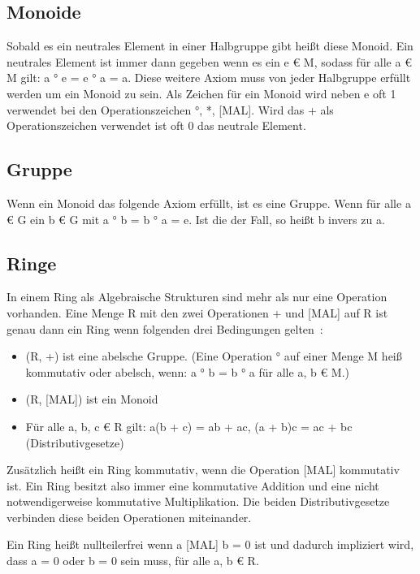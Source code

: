 		\subsection{Monoide}
			Sobald es ein neutrales Element in einer Halbgruppe gibt heißt diese Monoid. Ein neutrales Element ist immer dann gegeben wenn es ein e € M, sodass für alle a € M gilt: a ° e = e ° a = a. Diese weitere Axiom muss von jeder Halbgruppe erfüllt werden um ein Monoid zu sein. Als Zeichen für ein Monoid wird neben e oft 1 verwendet bei den Operationszeichen °, *, [MAL]. Wird das + als Operationszeichen verwendet ist oft 0 das neutrale Element.~\cite[S.~46]{Erste:Hilfe:in:Linearer:Algebra}
		
		\subsection{Gruppe}
			Wenn ein Monoid das folgende Axiom erfüllt, ist es eine Gruppe. Wenn für alle a € G ein b € G mit a ° b = b ° a = e. Ist die der Fall, so heißt b invers zu a.~\cite[S.~48]{Erste:Hilfe:in:Linearer:Algebra}
		
		\subsection{Ringe}
			In einem Ring als Algebraische Strukturen sind mehr als nur eine Operation vorhanden. Eine Menge R mit den zwei Operationen + und [MAL] auf R ist genau dann ein Ring wenn folgenden drei Bedingungen gelten~\cite[S.~58]{Erste:Hilfe:in:Linearer:Algebra}:
			
			\begin{itemize}
				\item (R, +) ist eine abelsche Gruppe. (Eine Operation ° auf einer Menge M heiß kommutativ oder abelsch, wenn: a ° b = b ° a für alle a, b € M.)
				\item (R, [MAL]) ist ein Monoid
				\item Für alle a, b, c € R gilt: a(b + c) = ab + ac, (a + b)c = ac + bc (Distributivgesetze)
			\end{itemize}
			
			Zusätzlich heißt ein Ring kommutativ, wenn die Operation [MAL] kommutativ ist. Ein Ring besitzt also immer eine kommutative Addition und eine nicht notwendigerweise kommutative Multiplikation. Die beiden Distributivgesetze verbinden diese beiden Operationen miteinander.~\cite[S.~58]{Erste:Hilfe:in:Linearer:Algebra}
			
			Ein Ring heißt nullteilerfrei wenn a [MAL] b = 0 ist und dadurch impliziert wird, dass a = 0 oder b = 0 sein muss, für alle a, b € R.~\cite[S.~58]{Erste:Hilfe:in:Linearer:Algebra}
			
